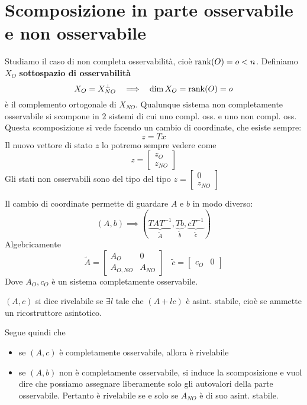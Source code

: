 \section{Scomposizione in parte osservabile e non osservabile}

Studiamo il caso di non completa osservabilità, cioè $\operatorname*{rank}(O) =o< n$. Definiamo $X_O$ \textbf{sottospazio di osservabilità}
\begin{equation*}
	X_O =X^{\perp }_{NO} \ \ \implies \ \ \dim X_O =\operatorname*{rank}(O) =o
\end{equation*}
è il complemento ortogonale di $X_{NO}$. Qualunque sistema non completamente osservabile si scompone in $2$ sistemi di cui uno compl. oss. e uno non compl. oss. Questa scomposizione si vede facendo un cambio di coordinate, che esiste sempre:
\begin{equation*}
	z=Tx
\end{equation*}
Il nuovo vettore di stato $z$ lo potremo sempre vedere come
\begin{equation*}
	z=\begin{bmatrix}
	z_O\\
	z_{NO}
	\end{bmatrix}
\end{equation*}
Gli stati non osservabili sono del tipo del tipo $z=\begin{bmatrix}
0\\
z_{NO}
\end{bmatrix}$

Il cambio di coordinate permette di guardare $A$ e $b$ in modo diverso:
\begin{equation*}
	(A,b)\implies \left(\underbrace{TAT^{-1}}_{\tilde{A}} ,\underbrace{Tb}_{\tilde{b}} ,\underbrace{cT^{-1}}_{\tilde{c}}\right)
\end{equation*}
Algebricamente
\begin{equation*}
	\tilde{A} =\begin{bmatrix}
	A_O & 0\\
	A_{O,NO} & A_{NO}
	\end{bmatrix} \ \ \ \ \tilde{c} =\begin{bmatrix}
	c_O & 0
	\end{bmatrix}
\end{equation*}
Dove $A_O ,c_O$ è un sistema completamente osservabile.
\begin{defn}
	$(A,c)$ si dice rivelabile se $\exists l$ tale che $(A+lc)$ è asint. stabile, cioè se ammette un ricostruttore asintotico.
\end{defn}
Segue quindi che
\begin{itemize}
	\item se $(A,c)$ è completamente osservabile, allora è rivelabile
	\item se $(A,b)$ non è completamente osservabile, si induce la scomposizione e vuol dire che possiamo assegnare liberamente solo gli autovalori della parte osservabile. Pertanto è rivelabile se e solo se $A_{NO}$ è di suo asint. stabile.
\end{itemize}


